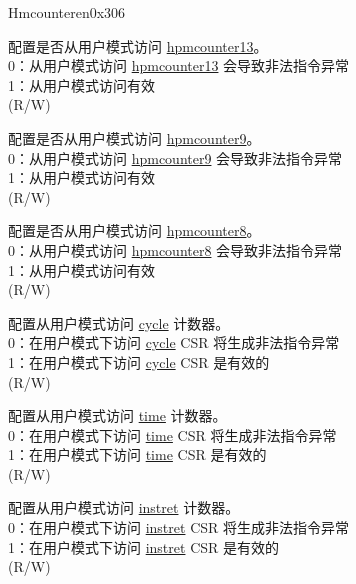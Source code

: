 \begin{register}{H}{mcounteren}{0x306}\label{regdesc:MCOUNTEREN}
%
%
%
%
%
%
%
%
%
\regnewline%
\begin{regdesc}\begin{reglist}
\label{fielddesc:MCOUNTEREN_HPM_13}\item [{HPM13}] 配置是否从用户模式访问 \hyperref[regdesc:HPMCOUNTER13] {hpmcounter13}。\\
0：从用户模式访问 \hyperref[regdesc:HPMCOUNTER13] {hpmcounter13} 会导致非法指令异常\\
1：从用户模式访问有效\\
(R/W)
\label{fielddesc:COUNTEREN_HPM9}\item [{HPM9}] 配置是否从用户模式访问 \hyperref[regdesc:HPMCOUNTER9] {hpmcounter9}。\\
0：从用户模式访问 \hyperref[regdesc:HPMCOUNTER9] {hpmcounter9} 会导致非法指令异常\\
1：从用户模式访问有效\\
(R/W)
\label{fielddesc:COUNTEREN_HPM_8}\item [{HPM8}] 配置是否从用户模式访问 \hyperref[regdesc:HPMCOUNTER8] {hpmcounter8}。\\
0：从用户模式访问 \hyperref[regdesc:HPMCOUNTER8] {hpmcounter8} 会导致非法指令异常\\
1：从用户模式访问有效\\
(R/W)
\label{fielddesc:MCOUNTEREN_CY}\item [CY] 配置从用户模式访问 \hyperref[regdesc:CYCLE]{cycle} 计数器。 \\
0：在用户模式下访问 \hyperref[regdesc:CYCLE]{cycle} CSR 将生成非法指令异常 \\
1：在用户模式下访问 \hyperref[regdesc:CYCLE]{cycle} CSR 是有效的 \\
(R/W) \\
\label{fielddesc:MCOUNTEREN_TM}\item [TM] 配置从用户模式访问 \hyperref[regdesc:TIME]{time} 计数器。 \\
0：在用户模式下访问 \hyperref[regdesc:TIME]{time} CSR 将生成非法指令异常 \\
1：在用户模式下访问 \hyperref[regdesc:TIME]{time} CSR 是有效的\\
(R/W)  \\
\label{fielddesc:MCOUNTEREN_IR}\item [IR] 配置从用户模式访问 \hyperref[regdesc:INSTRET]{instret} 计数器。 \\
0：在用户模式下访问 \hyperref[regdesc:INSTRET]{instret} CSR 将生成非法指令异常\\
1：在用户模式下访问 \hyperref[regdesc:INSTRET]{instret} CSR 是有效的 \\
(R/W) \\
\end{reglist}\end{regdesc}
\end{register}

